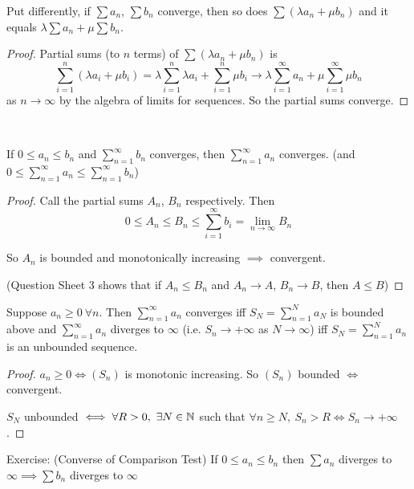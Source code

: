 \documentclass[twoside]{scrartcl}
\begin{document}
Put differently, if $\sum a_n$, $\sum b_n$ converge, then so does $\sum (\lambda a_n + \mu b_n)$ and it equals $\lambda \sum a_n + \mu \sum b_n$. 


\begin{proof}
Partial sums (to $n$ terms) of $\sum (\lambda a_n + \mu b_n)$ is 
\[\sum_{i=1}^{n} (\lambda a_i + \mu b_i) = \lambda \sum_{i=1}^{n} \lambda a_i + \sum_{i=1}^{n} \mu b_i \to \lambda \sum_{i=1}^{\infty} a_n + \mu \sum_{i=1}^{\infty} \mu b_n \]
as $n \to \infty$ by the algebra of limits for sequences. So the partial sums converge.
\end{proof}~



\begin{theorem}
If $0 \leq a_n \leq b_n$ and $\sum_{n=1}^{\infty} b_n$ converges, then $\sum_{n=1}^{\infty} a_n$ converges.	 (and $0 \leq \sum_{n=1}^{\infty}a_n \leq \sum_{n=1}^{\infty}b_n$)
\end{theorem}

\begin{proof}
Call the partial sums $A_n$, $B_n$ respectively. Then
\[0 \leq A_n \leq B_n \leq \sum_{i=1}^{\infty} b_i = \lim_{n\to \infty}B_n\]	

So $A_n$ is bounded and monotonically increasing $\implies$ convergent.
 
(Question Sheet 3 shows that if $A_n \leq B_n$ and $A_n \to A$, $B_n \to B$, then $A \leq B$)
\end{proof}\vspace*{5pt}


\begin{proposition}
Suppose $a_n \geq 0 ~\forall n$. Then $\sum_{n=1}^{\infty} a_n$ converges iff $S_N = \sum_{n=1}^{N}a_N$ is bounded above and $\sum_{n=1}^{\infty} a_n$ diverges to $\infty$ (i.e. $S_n \to +\infty$ as $N \to \infty$) iff $S_N = \sum_{n=1}^{N} a_n$ is an unbounded sequence. 
\end{proposition}

\begin{proof}
$a_n \geq 0 \iff (S_n)$ is monotonic increasing. So $(S_n)$ bounded $\iff$ convergent.

$S_N$ unbounded $\iff \forall R>0,~ \exists N \in \mathbb{N}$ such that $\forall n \geq N,~ S_n > R \iff S_n \to +\infty$. 
\end{proof}\vspace*{5pt}

Exercise: (Converse of Comparison Test)
If $0 \leq a_n \leq b_n$ then $\sum a_n$ diverges to $\infty\implies \sum b_n$ diverges to $\infty$\\
\end{document}
